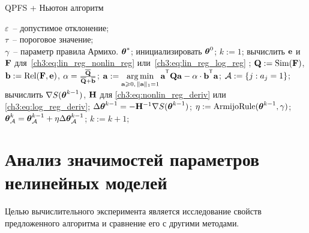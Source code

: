 \begin{algorithm}[ht]
	\caption{QPFS + Ньютон алгоритм}
	\label{pc:QPFSNewton}
	\begin{algorithmic}
		\REQUIRE $\varepsilon$~-- допустимое отклонение;\\
		\hspace{1.07cm}$\tau$~-- пороговое значение;\\
		\hspace{1.07cm}$\gamma$~-- параметр правила Армихо.
		\ENSURE $\boldsymbol{\theta}^*$;
		\STATE  инициализировать $\boldsymbol{\theta}^0$;
		\STATE $k := 1$;
		\REPEAT
		\STATE вычислить $\mathbf{e}$ и $\mathbf{F}$ для~\eqref{ch3:eq:lin_reg_nonlin_reg} или~\eqref{ch3:eq:lin_reg_log_reg} ;
		\vspace{0.1cm}
		\STATE $\mathbf{Q} := \text{Sim} (\mathbf{F})$, $\mathbf{b} := \text{Rel}(\mathbf{F}, \mathbf{e})$, $\alpha = \frac{\overline{\mathbf{Q}}}{\overline{\mathbf{Q}} + \overline{\mathbf{b}}}$;
		\vspace{0.1cm}
		\STATE $\ba := \argmin_{\ba \geq 0, \, \|\ba\|_1=1}\ba^{\T} \bQ \ba - \alpha \cdot \mathbf{b}^{\T} \ba$;
		\vspace{0.1cm}
		\STATE $\mathcal{A} := \{j: a_j = 1\}$;
		\vspace{0.1cm}
		\STATE вычислить $\nabla S(\boldsymbol{\theta}^{k-1})$, $\mathbf{H}$ для \eqref{ch3:eq:nonlin_reg_deriv} или \eqref{ch3:eq:log_reg_deriv};
		\vspace{0.1cm}
		\STATE $\Delta \boldsymbol{\theta}^{k-1} = - \mathbf{H}^{-1} \nabla S(\boldsymbol{\theta}^{k-1})$;
		\vspace{0.1cm}
		\STATE $\eta := \text{ArmijoRule}(\boldsymbol{\theta}^{k-1}, \gamma)$;
		\vspace{0.1cm}
		\STATE $\boldsymbol{\theta}_{\mathcal{A}}^k = \boldsymbol{\theta}_{\mathcal{A}}^{k - 1} + \eta \Delta \boldsymbol{\theta}_{\mathcal{A}}^{k - 1}$;
		\vspace{0.1cm}
		\STATE $k := k + 1$;
		\vspace{0.1cm}
	\end{algorithmic}
\end{algorithm}

\section{Анализ значимостей параметров нелинейных моделей}
\label{sec:ch4:newton_qpfs_exp}

Целью вычислительного эксперимента является исследование свойств предложенного алгоритма и сравнение его с другими методами. 

